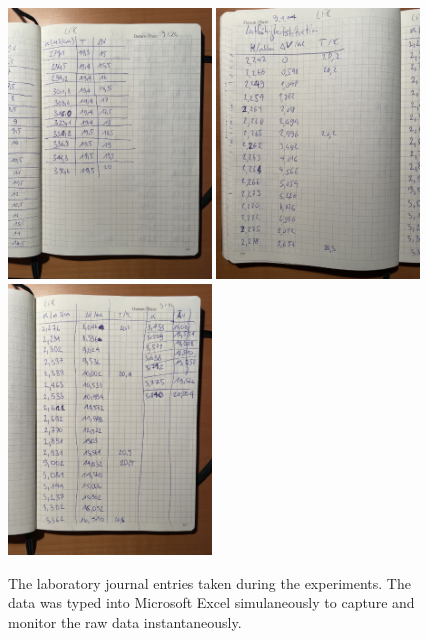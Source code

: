 \begin{figure}[H]
    \centering
    \includegraphics[width=0.48\textwidth]{figures/labjournal/lfk5.jpg} 
    \includegraphics[width=0.48\textwidth]{figures/labjournal/lfk6.jpg} 
    \includegraphics[width=0.48\textwidth]{figures/labjournal/lfk7.jpg} 
    \caption{The laboratory journal entries taken during the experiments. The data was typed into Microsoft Excel simulaneously to capture and monitor the raw data instantaneously.}
    \label{fig:labjournal}
\end{figure}

